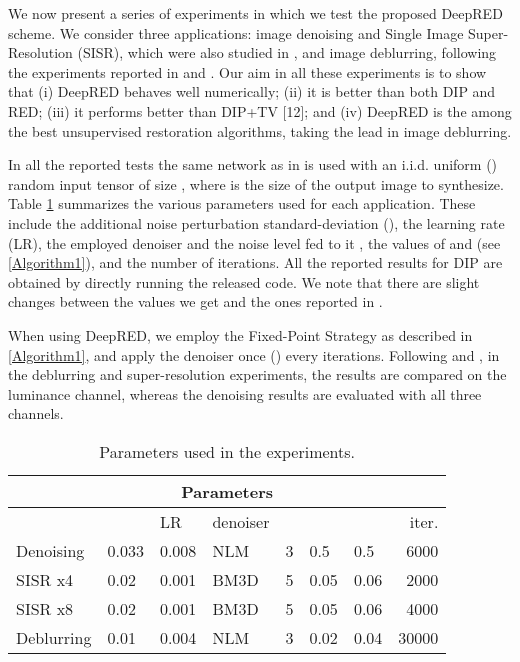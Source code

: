 \documentclass[12pt]{article}
\begin{document}
We now present a series of experiments in which we test the proposed DeepRED scheme. We consider three applications: image denoising and Single Image Super-Resolution (SISR), which were also studied in \cite{DIP-2018}, and image deblurring, following the experiments reported in \cite{RED-2017} and \cite{multi}. Our aim in all these experiments is to show that (i) DeepRED behaves well numerically; (ii) it is better than both DIP and RED; (iii) it performs better than DIP+TV [12]; and (iv) DeepRED is the among the best unsupervised restoration algorithms, taking the lead in image deblurring. 

In all the reported tests the same network as in \cite{DIP-2018} is used with an i.i.d. uniform () random input tensor of size , where  is the size of the output image to synthesize. Table \ref{Tab:params} summarizes the various parameters used for each application. These include the additional noise perturbation standard-deviation (), the learning rate (LR), the employed denoiser and the noise level fed to it , the values of  and  (see \ref{Algorithm1}), and the number of iterations. All the reported results for DIP are obtained by directly running the released code. We note that there are slight changes between the values we get and the ones reported in \cite{DIP-2018}. 

When using DeepRED, we employ the Fixed-Point Strategy as described in \ref{Algorithm1}, and apply the denoiser once () every  iterations. Following \cite{DIP-2018} and \cite{NCSR}, in the deblurring and super-resolution experiments, the results are compared on the luminance channel, whereas the denoising results are evaluated with all three channels. 

\begin{table}[htbp]
\centering
 \footnotesize\addtolength{\tabcolsep}{-5pt}
\begin{tabularx}{\linewidth}{|l||X X X X X X r|}
\hline
 \multicolumn{8}{|c|}{Parameters} \\
 \hline
&  & LR & denoiser &  &  &  & iter. \\ [0.5ex] 
 \hline
Denoising & 0.033 & 0.008 & NLM & 3 & 0.5 & 0.5 & 6000  \\
SISR x4 & 0.02 & 0.001 & BM3D & 5 &  0.05 & 0.06 & 2000 \\
SISR x8 & 0.02 & 0.001 & BM3D & 5 &  0.05 & 0.06 & 4000 \\
Deblurring & 0.01 & 0.004 & NLM & 3 &  0.02 & 0.04 & 30000 \\
\hline
\end{tabularx}
\caption{Parameters used in the experiments.}
 \label{Tab:params}
\end{table}
\end{document}
